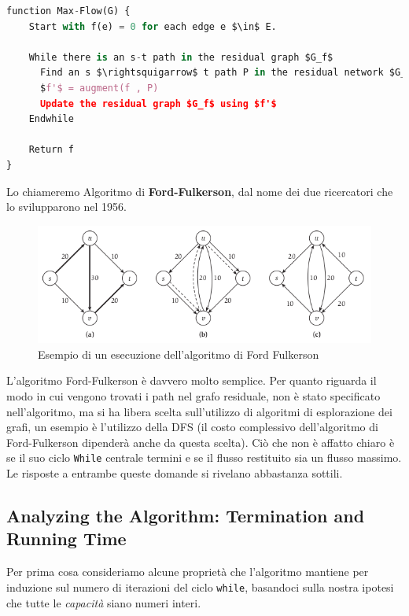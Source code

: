 \begin{lstlisting}[language=Python, mathescape=true]
function Max-Flow(G) {
	Start with f(e) = 0 for each edge e $\in$ E.

	While there is an s-t path in the residual graph $G_f$
  	  Find an s $\rightsquigarrow$ t path P in the residual network $G_f$
  	  $f'$ = augment(f , P)
  	  Update the residual graph $G_f$ using $f'$
	Endwhile

	Return f
}
\end{lstlisting}

Lo chiameremo Algoritmo di \textbf{Ford-Fulkerson}, dal nome dei due
ricercatori che lo svilupparono nel 1956.

\begin{figure}[H]
  \centering
  \includegraphics[width = 12 cm]{capitoli/network_flow/imgs/flow3.png}
  \caption{Esempio di un esecuzione dell'algoritmo di Ford Fulkerson}
\end{figure}

L'algoritmo Ford-Fulkerson è davvero molto semplice. Per quanto riguarda
il modo in cui vengono trovati i path nel grafo residuale, non è stato
specificato nell'algoritmo, ma si ha libera scelta sull'utilizzo di
algoritmi di esplorazione dei grafi, un esempio è l'utilizzo della DFS
(il costo complessivo dell'algoritmo di Ford-Fulkerson dipenderà anche
da questa scelta). Ciò che non è affatto chiaro è se il suo ciclo
\texttt{While} centrale termini e se il flusso restituito sia un flusso
massimo. Le risposte a entrambe queste domande si rivelano abbastanza
sottili.

\subsection{Analyzing the Algorithm: Termination and Running Time}

Per prima cosa consideriamo alcune proprietà che l'algoritmo mantiene
per induzione sul numero di iterazioni del ciclo \texttt{while},
basandoci sulla nostra ipotesi che tutte le \emph{capacità} siano numeri
interi.

